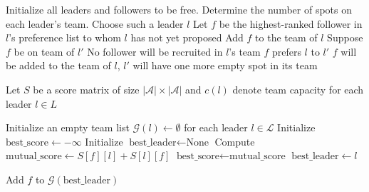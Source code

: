 \documentclass[10pt]{article} %
\begin{document}
\begin{algorithm}
\caption{Order Oriented Matching}\label{algo:stable_matching}
\begin{algorithmic}[1]
\State Initialize all leaders and followers to be free.
\State Determine the number of spots on each leader's team. 
    \State Choose such a leader $l$
    \State Let $f$ be the highest-ranked follower in $l$'s preference list to whom $l$ has not yet proposed
        \State Add $f$ to the team of $l$
    \Else
        \State Suppose $f$ be on team of $l'$
            \State No follower will be recruited in $l$'s team
        \Else
            \State $f$ prefers $l$ to $l'$
            \State $f$ will be added to the team of $l$, $l'$ will have one more empty spot in its team
        \EndIf
    \EndIf
\EndWhile
\end{algorithmic}
\end{algorithm}

\begin{algorithm}
\caption{Score Oriented Matching} \label{alg:best_free_leader}
\begin{algorithmic}[1]
\State Let $S$ be a score matrix of size $|\mathcal{A}| \times |\mathcal{A}|$ and $c(l)$ denote team capacity for each leader $l \in L$

\State Initialize an empty team list $\mathcal{G}(l) \gets \emptyset$ for each leader $l \in \mathcal{L}$
    \State Initialize $\text{best\_score} \gets -\infty$
    \State Initialize $\text{best\_leader} \gets \text{None}$
         
            \State Compute $\text{mutual\_score} \gets S[f][l] + S[l][f]$
                \State $\text{best\_score} \gets \text{mutual\_score}$
                \State $\text{best\_leader} \gets l$
            \EndIf
        \EndIf
    \EndFor

        \State Add $f$ to $\mathcal{G}(\text{best\_leader})$
    \EndIf
\EndFor

\end{algorithmic}
\end{algorithm}

\newpage
\end{document}
